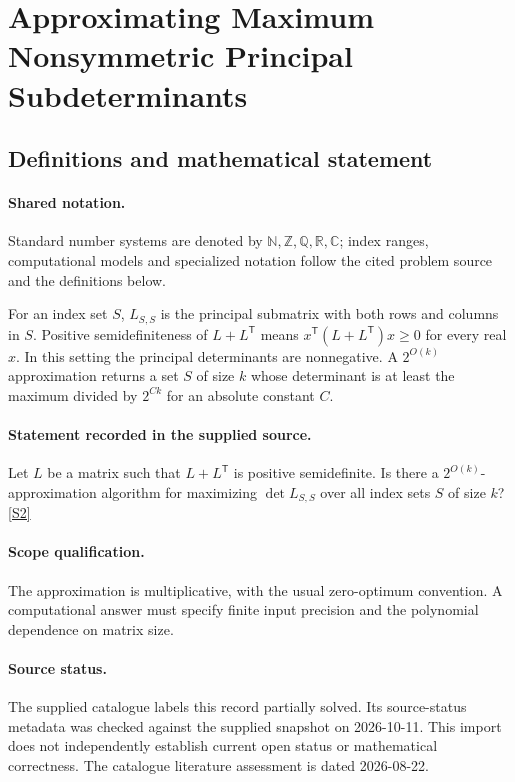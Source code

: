 \documentclass[11pt]{article}
\newcommand{\sref}[2]{\hyperlink{source:#1:#2}{[S#2]}}
\begin{document}
\section{Approximating Maximum Nonsymmetric Principal Subdeterminants}\label{statement}

\subsection{Definitions and mathematical statement}

\paragraph{Shared notation.}Standard number systems are denoted by $\mathbb N,\mathbb Z,\mathbb Q,\mathbb R,\mathbb C$; index ranges, computational models and specialized notation follow the cited problem source and the definitions below.


For an index set $S$, $L_{S,S}$ is the principal submatrix with both rows and columns in $S$. Positive semidefiniteness of $L+L^{\mathsf T}$ means $x^{\mathsf T}(L+L^{\mathsf T})x\geq0$ for every real $x$. In this setting the principal determinants are nonnegative. A $2^{O(k)}$ approximation returns a set $S$ of size $k$ whose determinant is at least the maximum divided by $2^{Ck}$ for an absolute constant $C$.
\paragraph{Statement recorded in the supplied source.}
Let $L$ be a matrix such that $L+L^\mathsf T$ is positive semidefinite. Is there a $2^{O(k)}$-approximation algorithm for maximizing $\det L_{S,S}$ over all index sets $S$ of size $k$? \sref{statement}{2}
\paragraph{Scope qualification.}
The approximation is multiplicative, with the usual zero-optimum convention. A computational answer must specify finite input precision and the polynomial dependence on matrix size.
\paragraph{Source status.}
The supplied catalogue labels this record partially solved. Its source-status metadata was checked against the supplied snapshot on 2026-10-11. This import does not independently establish current open status or mathematical correctness. The catalogue literature assessment is dated 2026-08-22.
\end{document}
